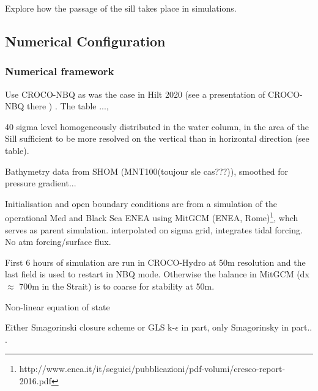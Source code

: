 Explore how the passage of the sill takes place in simulations.


\subsection{Numerical Configuration}
\subsubsection{Numerical framework}

Use CROCO-NBQ as was the case in Hilt 2020 (see a presentation of CROCO-NBQ there ) . The table ..., 

40 sigma level homogeneously distributed in the water column, in the area of the Sill sufficient to be more resolved on the vertical than in horizontal direction (see table).


Bathymetry data from SHOM (MNT100(toujour sle cas???)), smoothed for pressure gradient...

Initialisation and open boundary conditions are from a simulation of the operational Med and Black Sea ENEA using MitGCM (ENEA, Rome)\footnote{http://www.enea.it/it/seguici/pubblicazioni/pdf-volumi/cresco-report-2016.pdf}, whch serves as parent simulation. interpolated on sigma grid, integrates tidal forcing. No atm forcing/surface flux. 

First 6 hours of simulation are run in CROCO-Hydro at 50m resolution and the last field is used to restart in NBQ mode. Otherwise the balance in MitGCM (dx $\approx$ 700m in the Strait) is to coarse for stability at 50m.

Non-linear equation of state

Either Smagorinski closure scheme or GLS k-$\epsilon$ in part, only Smagorinsky in part.. .



